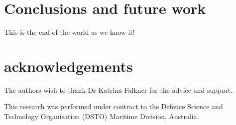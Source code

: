 \documentclass[twocolumn]{article}
\begin{document}
\section{Conclusions and future work}\label{sec:conc}
This is the end of the world as we know it!

\section{acknowledgements}
The authors wish to thank Dr Katrina Falkner for the advice and support.

This research was performed under contract to the Defence Science and Technology Organisation (DSTO) Maritime Division, Australia.



\cite{nakamoto--bitcoin}



\end{document}
